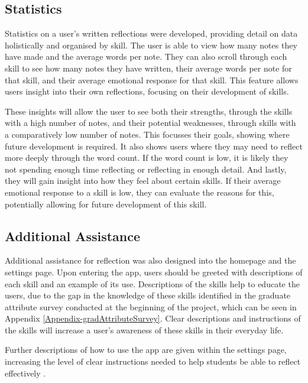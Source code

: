 \documentclass{l4proj}
\begin{document}
\subsection{Statistics}

Statistics on a user's written reflections were developed, providing detail on data holistically and organised by skill. The user is able to view how many notes they have made and the average words per note. They can also scroll through each skill to see how many notes they have written, their average words per note for that skill, and their average emotional response for that skill. This feature allows users insight into their own reflections, focusing on their development of skills.  

These insights will allow the user to see both their strengths, through the skills with a high number of notes, and their potential weaknesses, through skills with a comparatively low number of notes. This focusses their goals, showing where future development is required. It also shows users where they may need to reflect more deeply through the word count. If the word count is low, it is likely they not spending enough time reflecting or reflecting in enough detail. And lastly, they will gain insight into how they feel about certain skills. If their average emotional response to a skill is low, they can evaluate the reasons for this, potentially allowing for future development of this skill.


\subsection{Additional Assistance}

Additional assistance for reflection was also designed into the homepage and the settings page. Upon entering the app, users should be greeted with descriptions of each skill and an example of its use. Descriptions of the skills help to educate the users, due to the gap in the knowledge of these skills identified in the graduate attribute survey conducted at the beginning of the project, which can be seen in Appendix \ref{Appendix-gradAttributeSurvey}. Clear descriptions and instructions of the skills will increase a user’s awareness of these skills in their everyday life.

Further descriptions of how to use the app are given within the settings page, increasing the level of clear instructions needed to help students be able to reflect effectively \citep{bruno_reflective_2018}.
\end{document}
